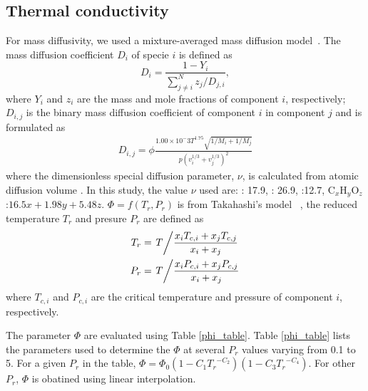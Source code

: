 \subsection{Thermal conductivity}
For mass diffusivity, we used a mixture-averaged mass diffusion model~\cite{kee1996chemkin}. The mass diffusion coefficient $D_i$ of specie $i$ is defined as
\begin{equation}
D_i=\frac{1-Y_i}{\sum^N_{j\neq i}z_j/D_{j,i}},\label{massdiff}
\end{equation}
where $Y_i$ and $z_i$ are the mass and mole fractions of component $i$, respectively; $D_{i,j}$ is the binary mass diffusion coefficient of component $i$ in component $j$ and is formulated as 
\begin{align}
    D_{i,j} = \phi \frac{1.00\times 10^-3 T^{1.75}\sqrt{1/M_i+1/M_j}}{p\left(v_i^{1/3}+v_j^{1/3}\right)^2 }
\end{align}
where the dimensionless special diffusion parameter, $\nu$, is calculated from atomic diffusion volume \cite{fuller1966new}. In this study, the value $\nu$ used are: : 17.9, : 26.9, :12.7, $\text{C}_x\text{H}_y\text{O}_z$:$16.5x+1.98y+5.48z$. $\Phi=f(T_r,P_r)$ is from Takahashi’s model ~\cite{takahashi1975preparation}, the reduced temperature $T_r$ and presure $P_r$ are defined as 
\begin{align}
 T_r &= \left. T \middle/\frac{x_i T_{c,i} +x_j T_{c,j}}{x_i+x_j} \right. \\
 P_r &= \left. T \middle/\frac{x_i P_{c,i} +x_j P_{c,j}}{x_i+x_j} \right. \\
\end{align}
where $T_{c,i}$ and $P_{c,i}$ are the critical temperature and pressure of component $i$, respectively.

The parameter $\Phi$ are evaluated using Table \ref{phi_table}. Table \ref{phi_table} lists the parameters used to determine the $\Phi$ at several $P_r$ values varying from 0.1 to 5. For a given $P_r$ in the table, $\Phi= \Phi_0\left(1-C_1{T_r}^{-C_2}\right)\left(1-C_3{T_r}^{-C_4}\right)$. For other $P_r$, $\Phi$ is obatined using linear interpolation. 

